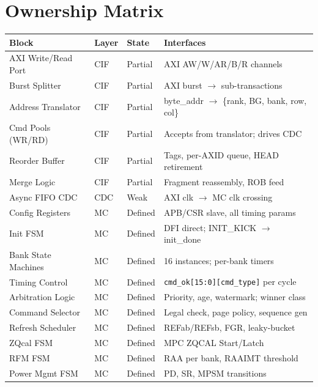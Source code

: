 \documentclass[10pt,a4paper]{article}
\newcommand{\Th}[1]{\cellcolor{thbg}\textbf{\small\color{acc1}#1}}
\newcommand{\RA}{\rowcolor{white}}
\newcommand{\RB}{\rowcolor{altbg}}
\begin{document}
\section{Ownership Matrix}

\begin{center}
\begin{tabularx}{\linewidth}{@{} l l l X @{}}
\toprule
\Th{Block} & \Th{Layer} & \Th{State} & \Th{Interfaces} \\
\midrule
\RA AXI Write/Read Port  & CIF & Partial & AXI AW/W/AR/B/R channels \\
\RB Burst Splitter       & CIF & Partial & AXI burst $\to$ sub-transactions \\
\RA Address Translator   & CIF & Partial & byte\_addr $\to$ \{rank, BG, bank, row, col\} \\
\RB Cmd Pools (WR/RD)    & CIF & Partial & Accepts from translator; drives CDC \\
\RA Reorder Buffer       & CIF & Partial & Tags, per-AXID queue, HEAD retirement \\
\RB Merge Logic          & CIF & Partial & Fragment reassembly, ROB feed \\
\RA Async FIFO CDC       & CDC & Weak   & AXI clk $\to$ MC clk crossing \\
\RB Config Registers     & MC  & Defined & APB/CSR slave, all timing params \\
\RA Init FSM             & MC  & Defined & DFI direct; INIT\_KICK $\to$ init\_done \\
\RB Bank State Machines  & MC  & Defined & 16 instances; per-bank timers \\
\RA Timing Control       & MC  & Defined & \texttt{cmd\_ok[15:0][cmd\_type]} per cycle \\
\RB Arbitration Logic    & MC  & Defined & Priority, age, watermark; winner class \\
\RA Command Selector     & MC  & Defined & Legal check, page policy, sequence gen \\
\RB Refresh Scheduler    & MC  & Defined & REFab/REFsb, FGR, leaky-bucket \\
\RA ZQcal FSM            & MC  & Defined & MPC ZQCAL Start/Latch \\
\RB RFM FSM              & MC  & Defined & RAA per bank, RAAIMT threshold \\
\RA Power Mgmt FSM       & MC  & Defined & PD, SR, MPSM transitions \\

\end{tabularx}
\end{center}
\end{document}
